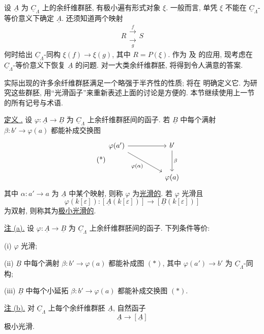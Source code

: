 设 $\underline A$ 为 $\underline C_\Lambda$ 上的余纤维群胚,
有极小遍有形式对象 $\xi$. 一般而言, 单凭 $\xi$
不能在 $\underline C_\Lambda$-等价意义下确定 $\underline A$.
还须知道两个映射
\[
 R\mathrel{\substack{\xrightarrow{\ f\ }\\[-.6ex]
                      \xrightarrow[\ g\ ]{}}}S
\]
何时给出 $\underline C_\Lambda$-同构
$\xi(f)\longrightarrow\xi(g)$, 其中 $R=P(\xi)$.
作为  及
 的应用,
现考虑在 $\underline C_\Lambda$-等价意义下恢复 $\underline A$ 的问题.
对一大类余纤维群胚, 将得到令人满意的答案.


实际出现的许多余纤维群胚满足一个略强于半齐性的性质;
将在  明确定义它.
为研究这些群胚, 用“光滑函子”来重新表述上面的讨论是方便的.
本节继续使用上一节的所有记号与术语.

\underline{定义 .}
设 $\varphi:\underline A\longrightarrow\underline B$
为 $\underline C_\Lambda$ 上余纤维群胚间的函子.
若 $\underline B$ 中每个满射 $\beta:b'\longrightarrow\varphi(a)$
都能补成交换图
\begin{equation}\tag{*}
\begin{tikzcd}[row sep=large,column sep=huge]
 \varphi(a') \arrow[r] \arrow[dr,"{\varphi(\alpha)}"']
 & b' \arrow[d,"\beta"]\\
 & \varphi(a)
\end{tikzcd}
\end{equation}
其中 $\alpha:a'\longrightarrow a$ 为 $\underline A$ 中某个映射,
则称 $\varphi$ 为\underline{光滑的}.
若 $\varphi$ 光滑且
\[
 \varphi(k[\varepsilon]):
 [\underline A(k[\varepsilon])]
 \longrightarrow
 [\underline B(k[\varepsilon])]
\]
为双射, 则称其为\underline{极小光滑的}.

\underline{注 (a).}
设 $\varphi:\underline A\longrightarrow\underline B$
为 $\underline C_\Lambda$ 上余纤维群胚间的函子. 下列条件等价:

(i) $\varphi$ 光滑;

(ii) $\underline B$ 中每个满射 $\beta:b'\longrightarrow\varphi(a)$
都能补成图 $(*)$, 其中 $\varphi(a')\longrightarrow b'$
为 $\underline C_\Lambda$-同构;

(iii) $\underline B$ 中每个小延拓 $\beta:b'\longrightarrow\varphi(a)$
都能补成交换图 $(*)$.

\underline{注 (b).}
对 $\underline C_\Lambda$ 上每个余纤维群胚 $\underline A$, 自然函子
\[
 \underline A\longrightarrow[\underline A]
\]
极小光滑.

